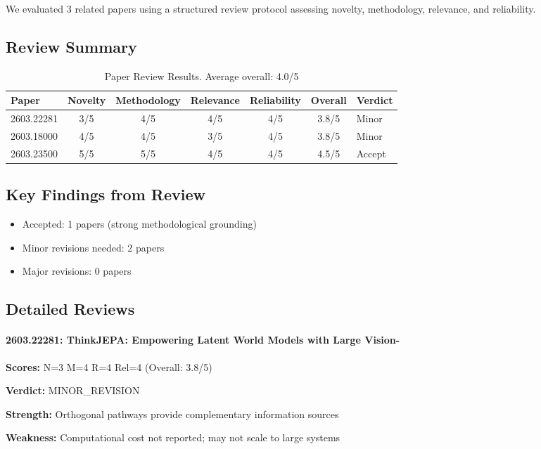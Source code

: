 \documentclass[11pt]{article}
\begin{document}
We evaluated 3 related papers using a structured
review protocol assessing novelty, methodology, relevance, and reliability.

\subsection{Review Summary}

\begin{table}[h]
\centering
\begin{tabular}{lcccccl}
\toprule
Paper & Novelty & Methodology & Relevance & Reliability & Overall & Verdict \\
\midrule
2603.22281 & 3/5 & 4/5 & 4/5 & 4/5 & 3.8/5 & Minor \\
2603.18000 & 4/5 & 4/5 & 3/5 & 4/5 & 3.8/5 & Minor \\
2603.23500 & 5/5 & 5/5 & 4/5 & 4/5 & 4.5/5 & Accept \\
\bottomrule
\end{tabular}
\caption{Paper Review Results. Average overall: 4.0/5}
\end{table}

\subsection{Key Findings from Review}

\begin{itemize}
\item Accepted: 1 papers (strong methodological grounding)
\item Minor revisions needed: 2 papers
\item Major revisions: 0 papers
\end{itemize}

\subsection{Detailed Reviews}

\paragraph{2603.22281: ThinkJEPA: Empowering Latent World Models with Large Vision-}
{\bf Scores:} N=3 M=4 R=4 Rel=4 (Overall: 3.8/5)

{\bf Verdict:} MINOR_REVISION

{\bf Strength:} Orthogonal pathways provide complementary information sources

{\bf Weakness:} Computational cost not reported; may not scale to large systems
\end{document}
